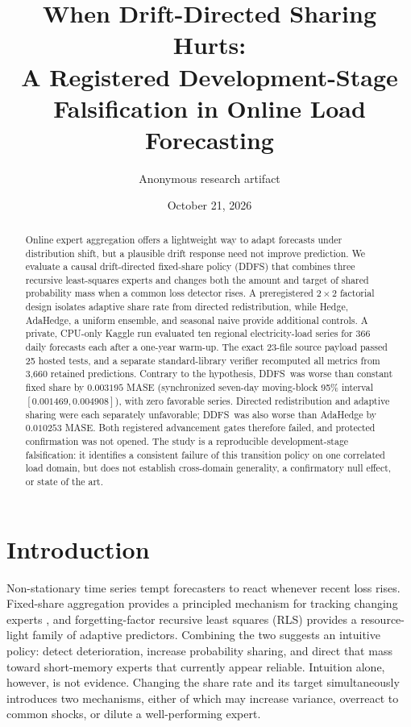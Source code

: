 \documentclass[10pt]{article}
\title{When Drift-Directed Sharing Hurts:\\
A Registered Development-Stage Falsification in Online Load Forecasting}
\author{Anonymous research artifact}
\date{October 21, 2026}
\newcommand{\ddfs}{\textsc{DDFS}}
\begin{document}
\maketitle

\begin{abstract}
Online expert aggregation offers a lightweight way to adapt forecasts under
distribution shift, but a plausible drift response need not improve prediction.
We evaluate a causal drift-directed fixed-share policy (\ddfs) that combines three
recursive least-squares experts and changes both the amount and target of shared
probability mass when a common loss detector rises. A preregistered $2\times2$
factorial design isolates adaptive share rate from directed redistribution, while
Hedge, AdaHedge, a uniform ensemble, and seasonal naive provide additional controls.
A private, CPU-only Kaggle run evaluated ten regional electricity-load series for
366 daily forecasts each after a one-year warm-up. The exact 23-file source payload
passed 25 hosted tests, and a separate standard-library verifier recomputed all
metrics from 3,660 retained predictions. Contrary to the hypothesis, \ddfs\ was
worse than constant fixed share by $0.003195$ MASE (synchronized seven-day
moving-block 95\% interval $[0.001469,0.004908]$), with zero favorable series.
Directed redistribution and adaptive sharing were each separately unfavorable;
\ddfs\ was also worse than AdaHedge by $0.010253$ MASE. Both registered advancement
gates therefore failed, and protected confirmation was not opened. The study is a
reproducible development-stage falsification: it identifies a consistent failure of
this transition policy on one correlated load domain, but does not establish
cross-domain generality, a confirmatory null effect, or state of the art.
\end{abstract}

\section{Introduction}

Non-stationary time series tempt forecasters to react whenever recent loss rises.
Fixed-share aggregation provides a principled mechanism for tracking changing
experts \citep{herbster1998tracking}, and forgetting-factor recursive least squares
(RLS) provides a resource-light family of adaptive predictors. Combining the two
suggests an intuitive policy: detect deterioration, increase probability sharing,
and direct that mass toward short-memory experts that currently appear reliable.
Intuition alone, however, is not evidence. Changing the share rate and its target
simultaneously introduces two mechanisms, either of which may increase variance,
overreact to common shocks, or dilute a well-performing expert.
\end{document}
